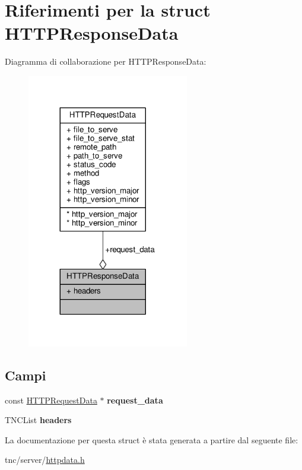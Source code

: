 \hypertarget{structHTTPResponseData}{}\section{Riferimenti per la struct H\+T\+T\+P\+Response\+Data}
\label{structHTTPResponseData}


Diagramma di collaborazione per H\+T\+T\+P\+Response\+Data\+:\nopagebreak
\begin{figure}[H]
\begin{center}
\leavevmode
\includegraphics[width=200pt]{structHTTPResponseData__coll__graph}
\end{center}
\end{figure}
\subsection*{Campi}
\begin{DoxyCompactItemize}
\item 
\hypertarget{structHTTPResponseData_a2ea29f58aa5a67164dcdaa8cc9300340}{}const \hyperlink{structHTTPRequestData}{H\+T\+T\+P\+Request\+Data} $\ast$ {\bfseries request\+\_\+data}\label{structHTTPResponseData_a2ea29f58aa5a67164dcdaa8cc9300340}

\item 
\hypertarget{structHTTPResponseData_ab12d3e6ec05acade8e26c354a15e1d98}{}T\+N\+C\+List {\bfseries headers}\label{structHTTPResponseData_ab12d3e6ec05acade8e26c354a15e1d98}

\end{DoxyCompactItemize}


La documentazione per questa struct è stata generata a partire dal seguente file\+:\begin{DoxyCompactItemize}
\item 
tnc/server/\hyperlink{httpdata_8h}{httpdata.\+h}\end{DoxyCompactItemize}
